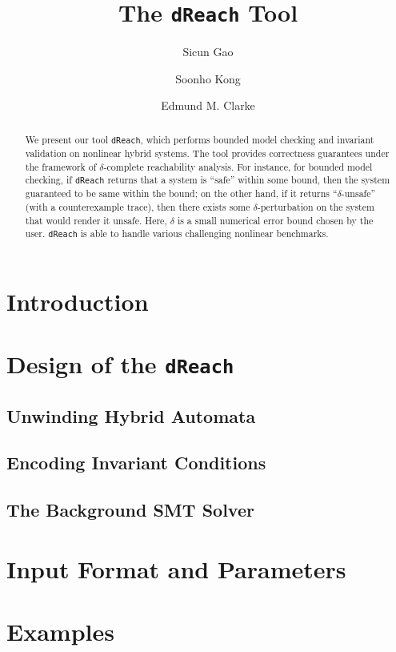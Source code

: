 \documentclass[envcountsect]{llncs}
\title{The {\tt dReach} Tool}
\author{Sicun Gao \and Soonho Kong \and Edmund M. Clarke}
\institute{Carnegie Mellon University, Pittsburgh, PA 15213}
\newcommand{\dreach}{{\tt dReach}}
\begin{document}
\maketitle

\begin{abstract}
We present our tool {\tt dReach}, which performs bounded model checking
and invariant validation on nonlinear hybrid systems. The tool provides
correctness guarantees under the framework of $\delta$-complete reachability
analysis. For instance, for bounded model checking, if {\tt dReach} returns that
a system is ``safe'' within some bound, then the system guaranteed to be same
within the bound; on the other hand, if it returns ``$\delta$-unsafe'' (with a
counterexample trace), then there exists some $\delta$-perturbation on the
system that would render it unsafe. Here, $\delta$ is a small numerical error
bound chosen by the user. {\tt dReach} is able to handle various challenging
nonlinear benchmarks. 
\end{abstract}

\section{Introduction}

\section{Design of the \dreach}

\subsection{Unwinding Hybrid Automata}

\subsection{Encoding Invariant Conditions}

\subsection{The Background SMT Solver}

\section{Input Format and Parameters}


\section{Examples}




\end{document}
